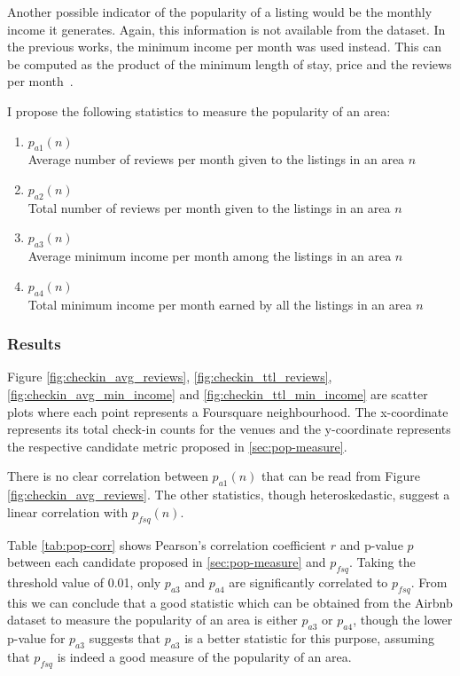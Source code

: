 Another possible indicator of the popularity of a listing would be the monthly income it generates. Again, this information is not available from the dataset. In the previous works, the minimum income per month was used instead. This can be computed as the product of the minimum length of stay, price and the reviews per month~\citep{cansoy2016gets, insideairbnb}. 

I propose the following statistics to measure the popularity of an area:
\begin{enumerate}
\item $p_{a1}(n)$\\ Average number of reviews per month given to the listings in an area $n$
\item $p_{a2}(n)$\\ Total number of reviews per month given to the listings in an area $n$
\item $p_{a3}(n)$\\ Average minimum income per month among the listings in an area $n$
\item $p_{a4}(n)$\\ Total minimum income per month earned by all the listings in an area $n$
\end{enumerate}
\label{sec:pop-measure}
\subsubsection{Results}
Figure \ref{fig:checkin_avg_reviews}, \ref{fig:checkin_ttl_reviews}, \ref{fig:checkin_avg_min_income} and \ref{fig:checkin_ttl_min_income} are scatter plots where each point represents a Foursquare neighbourhood. The x-coordinate represents its total check-in counts for the venues and the y-coordinate represents the respective candidate metric proposed in \ref{sec:pop-measure}.

There is no clear correlation between $p_{a1}(n)$ that can be read from Figure \ref{fig:checkin_avg_reviews}. The other statistics, though heteroskedastic, suggest a linear correlation with $p_{fsq}(n)$.

Table \ref{tab:pop-corr} shows Pearson's correlation coefficient $r$ and p-value $p$ between each candidate proposed in \ref{sec:pop-measure} and $p_{fsq}$.
Taking the threshold value of 0.01, only $p_{a3}$ and $p_{a4}$ are significantly correlated to $p_{fsq}$. From this we can conclude that a good statistic which can be obtained from the Airbnb dataset to measure the popularity of an area is either $p_{a3}$ or $p_{a4}$, though the lower p-value for $p_{a3}$ suggests that $p_{a3}$ is a better statistic for this purpose, assuming that $p_{fsq}$ is indeed a good measure of the popularity of an area.

